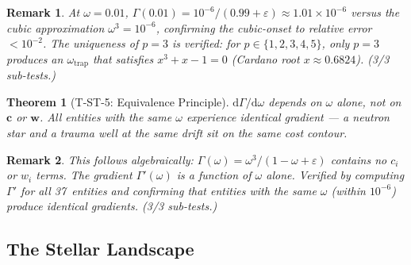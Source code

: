 \documentclass[
  aps,
  prd,
  twocolumn,
  superscriptaddress,
  nofootinbib,
  floatfix
]{revtex4-2}
\newtheorem{theorem}{Theorem}
\newtheorem{remark}{Remark}
\newcommand{\Gam}{\Gamma}
\newcommand{\eps}{\varepsilon}
\newcommand{\dd}{\mathrm{d}}
\newcommand{\tvec}{\mathbf{c}}
\newcommand{\wvec}{\mathbf{w}}
\begin{document}
\begin{remark}
At $\omega = 0.01$, $\Gam(0.01) = 10^{-6}/(0.99 + \eps)
\approx 1.01 \times 10^{-6}$ versus the cubic approximation
$\omega^3 = 10^{-6}$, confirming the cubic-onset to
relative error $< 10^{-2}$.  The uniqueness of $p = 3$
is verified: for $p \in \{1, 2, 3, 4, 5\}$, only $p = 3$
produces an $\omega_{\mathrm{trap}}$ that satisfies
$x^3 + x - 1 = 0$ (Cardano root $x \approx 0.6824$).
(3/3 sub-tests.)
\end{remark}

\begin{theorem}[T-ST-5: Equivalence Principle]\label{thm:T5}
$\dd\Gam/\dd\omega$ depends on $\omega$ alone, not on
$\tvec$ or $\wvec$.  All entities with the same $\omega$
experience identical gradient --- a neutron star and a
trauma well at the same drift sit on the same cost contour.
\end{theorem}

\begin{remark}
This follows algebraically: $\Gam(\omega) = \omega^3/
(1 - \omega + \eps)$ contains no $c_i$ or $w_i$
terms.  The gradient $\Gam'(\omega)$ is a function of
$\omega$ alone.  Verified by computing $\Gam'$ for all
37~entities and confirming that entities with the same
$\omega$ (within $10^{-6}$) produce identical gradients.
(3/3 sub-tests.)
\end{remark}

\subsection{The Stellar Landscape}
\end{document}
